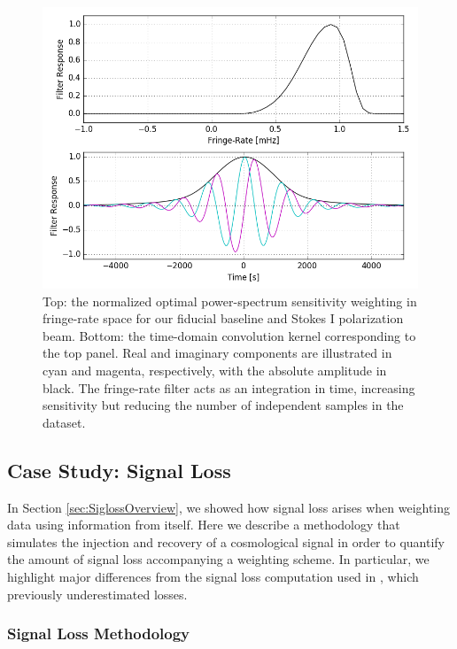 \documentclass[preprint2,numberedappendix,tighten]{aastex6}  %
\begin{document}
\begin{figure}
	\centering
	\includegraphics[width=\columnwidth]{plots/frp.png}
	\caption{Top: the normalized optimal power-spectrum sensitivity weighting in fringe-rate space for our fiducial baseline and Stokes I polarization beam. Bottom: the time-domain convolution kernel corresponding to the top panel. Real and imaginary components are illustrated in cyan and magenta, respectively, with the absolute amplitude in black. The fringe-rate filter acts as an integration in time, increasing sensitivity but reducing the number of independent samples in the dataset.}
	\label{fig:frp}
\end{figure}

\subsection{Case Study: Signal Loss}
\label{sec:Sigloss}

In Section \ref{sec:SiglossOverview}, we showed how signal loss arises when weighting data using information from itself. Here we describe a methodology that simulates the injection and recovery of a cosmological signal in order to quantify the amount of signal loss accompanying a weighting scheme. In particular, we highlight major differences from the signal loss computation used in \citet{ali_et_al2015}, which previously underestimated losses. 

\subsubsection{Signal Loss Methodology} 
\end{document}
